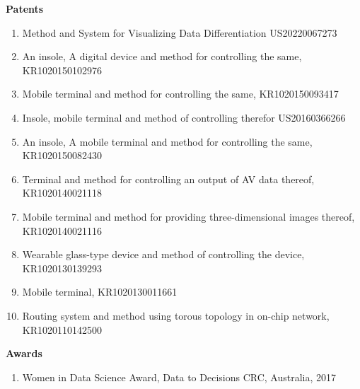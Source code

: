 \documentclass[letterpaper,11pt]{article}
\newcommand{\resheading}[1]{{\large \colorbox{mygrey}{\begin{minipage}{\textwidth}{\textbf{#1 \vphantom{p\^{E}}}}\end{minipage}}}}
\begin{document}
\resheading{Patents}
    \begin{enumerate}
    	\item Method and System for Visualizing Data Differentiation US20220067273
        \item An insole, A digital device and method for controlling the same, KR1020150102976
        \item Mobile terminal and method for controlling the same, KR1020150093417
        \item Insole, mobile terminal and method of controlling therefor US20160366266
        \item An insole, A mobile terminal and method for controlling the same, KR1020150082430
        \item Terminal and method for controlling an output of AV data thereof, KR1020140021118
        \item Mobile terminal and method for providing three-dimensional images thereof, KR1020140021116
        \item Wearable glass-type device and method of controlling the device, KR1020130139293
        \item Mobile terminal, KR1020130011661
        \item Routing system and method using torous topology in on-chip network, KR1020110142500
    \end{enumerate}

\resheading{Awards}
    \begin{enumerate}
        \item Women in Data Science Award, Data to Decisions CRC, Australia, 2017
    \end{enumerate}
\end{document}
